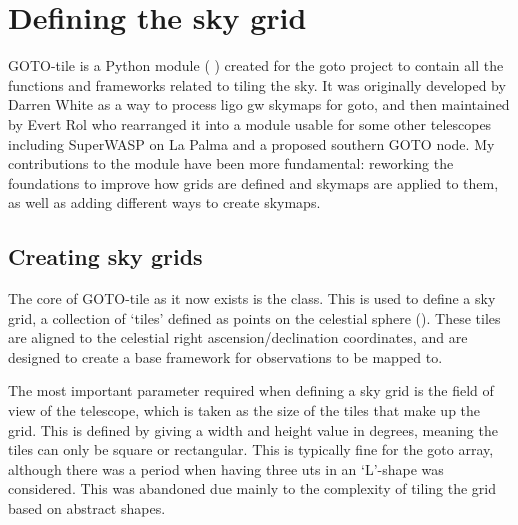 \newpage
\section{Defining the sky grid}
\label{sec:gototile}
\begin{colsection}


\begin{colsection}


GOTO-tile is a Python module ( ) created for the \gls{goto} project to contain all the functions and frameworks related to tiling the sky. It was originally developed by Darren White as a way to process \gls{ligo} \gls{gw} skymaps for \gls{goto}, and then maintained by Evert Rol who rearranged it into a module usable for some other telescopes including SuperWASP on La Palma and a proposed southern GOTO node. My contributions to the module have been more fundamental: reworking the foundations to improve how grids are defined and skymaps are applied to them, as well as adding different ways to create skymaps.

\end{colsection}


\subsection{Creating sky grids}
\label{sec:grids}
\begin{colsection}

The core of GOTO-tile as it now exists is the  class. This is used to define a sky grid, a collection of `tiles' defined as points on the celestial sphere (). These tiles are aligned to the celestial right ascension/declination coordinates, and are designed to create a base framework for observations to be mapped to.

The most important parameter required when defining a sky grid is the field of view of the telescope, which is taken as the size of the tiles that make up the grid. This is defined by giving a width and height value in degrees, meaning the tiles can only be square or rectangular. This is typically fine for the \gls{goto} array, although there was a period when having three \glspl{ut} in an `L'-shape was considered. This was abandoned due mainly to the complexity of tiling the grid based on abstract shapes.


\end{colsection}
\end{colsection}
